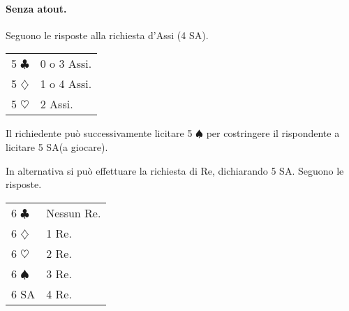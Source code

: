 \documentclass[a4paper,10pt]{article}
\renewcommand{\c}{$\clubsuit$\xspace}
\renewcommand{\d}{$\diamondsuit$\xspace}
\newcommand{\h}{$\heartsuit$\xspace}
\newcommand{\s}{$\spadesuit$\xspace}
\newcommand{\sa}{SA\xspace}
\newcommand{\smallspace}{\vskip0.3cm}
\newenvironment{twocol}
  {\smallspace\noindent\begin{tabular}{l p{0.8\textwidth}}}
  {\end{tabular}\smallspace}
\begin{document}
\paragraph{Senza atout.} Seguono le risposte alla richiesta d'Assi (4 \sa).

\begin{twocol}
5 \c & 0 o 3 Assi.\\
5 \d & 1 o 4 Assi.\\
5 \h & 2 Assi.\\
\end{twocol}

\noindent Il richiedente può successivamente licitare 5 \s per costringere il rispondente a licitare 5 \sa (a giocare).

\smallspace

\noindent In alternativa si può effettuare la richiesta di Re, dichiarando 5 \sa. Seguono le risposte.

\begin{twocol}
6 \c & Nessun Re.\\
6 \d & 1 Re.\\
6 \h & 2 Re.\\
6 \s & 3 Re. \\
6 \sa & 4 Re.
\end{twocol}
\end{document}
